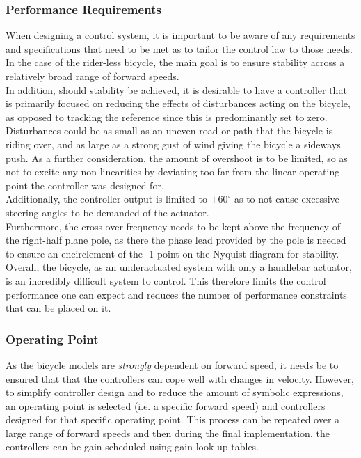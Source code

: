 \subsubsection{Performance Requirements}
When designing a control system, it is important to be aware of any requirements and specifications that need to be met as to tailor the control law to those needs. In the case of the rider-less bicycle, the main goal is to ensure stability across a relatively broad range of forward speeds.\\

In addition, should stability be achieved, it is desirable to have a controller that is primarily focused on reducing the effects of disturbances acting on the bicycle, as opposed to tracking the reference since this is predominantly set to zero. Disturbances could be as small as an uneven road or path that the bicycle is riding over, and as large as a strong gust of wind giving the bicycle a sideways push. As a further consideration, the amount of overshoot is to be limited, so as not to excite any non-linearities by deviating too far from the linear operating point the controller was designed for. \\

Additionally, the controller output is limited to $\pm 60^{\circ}$ as to not cause excessive steering angles to be demanded of the actuator. \\

Furthermore, the cross-over frequency needs to be kept above the frequency of the right-half plane pole, as there the phase lead provided by the pole is needed to ensure an encirclement of the -1 point on the Nyquist diagram for stability. \\

Overall, the bicycle, as an underactuated system with only a handlebar actuator, is an incredibly difficult system to control. This therefore limits the control performance one can expect and reduces the number of performance constraints that can be placed on it.

\subsubsection{Operating Point}
As the bicycle models are \textit{strongly} dependent on forward speed, it needs be to ensured that that the controllers can cope well with changes in velocity. However, to simplify controller design and to reduce the amount of symbolic expressions, an operating point is selected (i.e. a specific forward speed) and controllers designed for that specific operating point. This process can be repeated over a large range of forward speeds and then during the final implementation, the controllers can be gain-scheduled using gain look-up tables. \\

